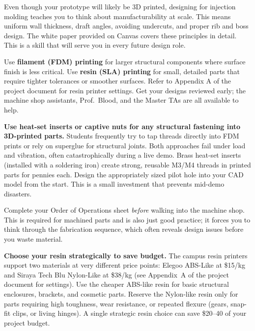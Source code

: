 \begin{faqbox}
Even though your prototype will likely be 3D printed, designing for injection molding teaches you to think about manufacturability at scale. This means uniform wall thickness, draft angles, avoiding undercuts, and proper rib and boss design. The white paper provided on Canvas covers these principles in detail. This is a skill that will serve you in every future design role.
\end{faqbox}

\begin{faqbox}
Use \textbf{filament (FDM) printing} for larger structural components where surface finish is less critical. Use \textbf{resin (SLA) printing} for small, detailed parts that require tighter tolerances or smoother surfaces. Refer to Appendix A of the project document for resin printer settings. Get your designs reviewed early; the machine shop assistants, Prof.\ Blood, and the Master TAs are all available to help.
\end{faqbox}

\begin{protip}
\textbf{Use heat-set inserts or captive nuts for any structural fastening into 3D-printed parts.} Students frequently try to tap threads directly into FDM prints or rely on superglue for structural joints. Both approaches fail under load and vibration, often catastrophically during a live demo. Brass heat-set inserts (installed with a soldering iron) create strong, reusable M3/M4 threads in printed parts for pennies each. Design the appropriately sized pilot hole into your CAD model from the start. This is a small investment that prevents mid-demo disasters.
\end{protip}

\begin{tipbox}
Complete your Order of Operations sheet \textit{before} walking into the machine shop. This is required for machined parts and is also just good practice; it forces you to think through the fabrication sequence, which often reveals design issues before you waste material.
\end{tipbox}

\begin{protip}
\textbf{Choose your resin strategically to save budget.} The campus resin printers support two materials at very different price points: Elegoo ABS-Like at \$15/kg and Siraya Tech Blu Nylon-Like at \$38/kg (see Appendix~A of the project document for settings). Use the cheaper ABS-like resin for basic structural enclosures, brackets, and cosmetic parts. Reserve the Nylon-like resin only for parts requiring high toughness, wear resistance, or repeated flexure (gears, snap-fit clips, or living hinges). A single strategic resin choice can save \$20--40 of your project budget.
\end{protip}

